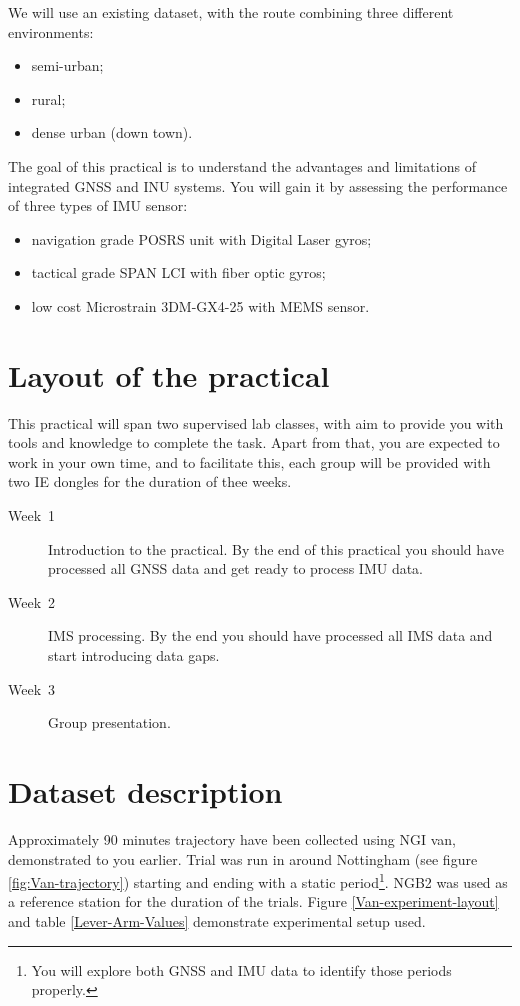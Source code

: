 \documentclass[11pt,fleqn]{book} %
\begin{document}
We will use an existing dataset, with the route combining three different environments:

\begin{itemize}
	\item semi-urban;
	\item rural;
	\item dense urban (down town).
\end{itemize}

The goal of this practical is to understand the advantages and limitations of integrated GNSS and INU systems. You will gain it by assessing the performance of three types of IMU sensor:

\begin{itemize}
	\item navigation grade POSRS unit with Digital Laser gyros;
	\item tactical grade SPAN LCI with fiber optic gyros;
	\item low cost Microstrain 3DM-GX4-25 with MEMS sensor.
\end{itemize}


\section{Layout of the practical}

This practical will span two supervised lab classes, with aim to provide you with tools and knowledge to complete the task. Apart from that, you are expected to work in your own time, and to facilitate this, each group will be provided with two IE dongles for the duration of thee weeks.

\begin{description}
	\item [{Week~1}] Introduction to the practical. By the end of this practical you should
	have processed all GNSS data and get ready to process IMU data.
	\item [{Week~2}] IMS processing. By the end you should have processed
	all IMS data and start introducing data gaps.
	\item [{Week~3}] Group presentation.
\end{description}

\section{Dataset description}

Approximately 90 minutes trajectory have been collected using NGI van, demonstrated to you earlier. Trial was run in around Nottingham (see figure \ref{fig:Van-trajectory}) starting and ending with a static period\footnote{You will explore both GNSS and IMU data to identify those periods properly.}. NGB2 was used as a reference station for the duration of the trials.
Figure \ref{Van-experiment-layout} and table \ref{Lever-Arm-Values} demonstrate experimental setup used.
\end{document}
